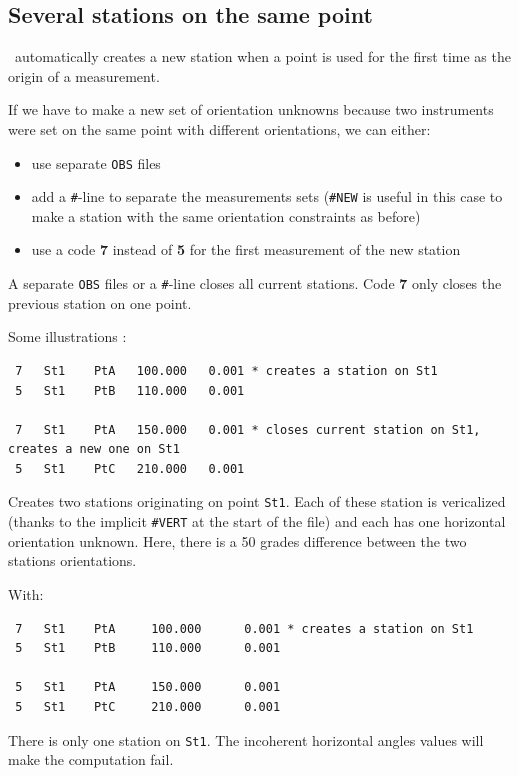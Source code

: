 \subsection{Several stations on the same point}
\label{subsec:SeveralStationsSamePoint}

\CdPPP\ automatically creates a new station when a point is used for the first time as the origin of a measurement.

If we have to make a new set of orientation unknowns because two instruments were set on the same point with different
orientations, we can either:

\begin{itemize}
   \item use separate \texttt{OBS} files
   \item add a \texttt{\#}-line to separate the measurements sets (\texttt{\#NEW} is useful in this case to make a station with the same orientation constraints as before)
   \item use a code \textbf{7} instead of \textbf{5} for the first measurement of the new station
\end{itemize}

A separate \texttt{OBS} files or a \texttt{\#}-line closes all current stations.
Code \textbf{7} only closes the previous station on one point. 

Some illustrations :
\begin{verbatim}
 7   St1    PtA   100.000   0.001 * creates a station on St1
 5   St1    PtB   110.000   0.001

 7   St1    PtA   150.000   0.001 * closes current station on St1, creates a new one on St1
 5   St1    PtC   210.000   0.001
\end{verbatim}
Creates two stations originating on point \texttt{St1}. Each of these station
is vericalized (thanks to the implicit \texttt{\#VERT} at the start of the file) and each has one horizontal orientation unknown.
Here, there is a 50 grades difference between the two stations orientations.

With:
\begin{verbatim}
 7   St1    PtA     100.000      0.001 * creates a station on St1
 5   St1    PtB     110.000      0.001

 5   St1    PtA     150.000      0.001
 5   St1    PtC     210.000      0.001
\end{verbatim}
There is only one station on \texttt{St1}. The incoherent horizontal angles values
will make the computation fail.

